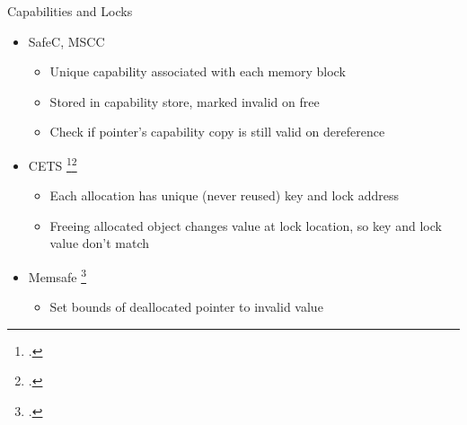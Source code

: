 \documentclass[aspectratio=169]{beamer}
\begin{document}
\begin{frame}{Capabilities and Locks}
    \pause
    \begin{itemize}
        \item SafeC, MSCC %
            \begin{itemize}
              \item Unique capability associated with each memory block
              \item Stored in capability store, marked invalid on free
              \item Check if pointer's capability copy is still valid on dereference
            \end{itemize}
        \pause
        \item CETS \footcite{nagarakatte_cets:_2010}\footcite{nagarakatte_everything_2015}
            \begin{itemize}
                \item Each allocation has unique (never reused) key and lock address 
                \item Freeing allocated object changes value at lock location, so key and lock value don't match
            \end{itemize}
        \pause
        \item Memsafe \footcite{simpson_memsafe:_2013}
            \begin{itemize}
                \item Set bounds of deallocated pointer to invalid value %
            \end{itemize}
    \end{itemize}
\end{frame}
\end{document}
